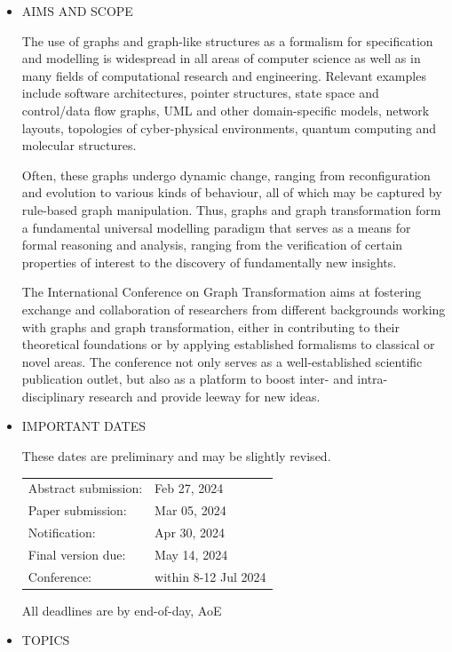 \documentclass[prodmode,acmtecs]{acmsmall} %
\begin{document}
\begin{itemize}\item  AIMS AND SCOPE 
 
  The use of graphs and graph-like structures as a formalism for specification and modelling is widespread in all areas of computer science as well as in many fields of computational research and engineering. Relevant examples include software architectures, pointer structures, state space and control/data flow graphs, UML and other domain-specific models, network layouts, topologies of cyber-physical environments, quantum computing and molecular structures.  
 
  Often, these graphs undergo dynamic change, ranging from reconfiguration and evolution to various kinds of behaviour, all of which may be captured by rule-based graph manipulation. Thus, graphs and graph transformation form a fundamental universal modelling paradigm that serves as a means for formal reasoning and analysis, ranging from the verification of certain properties of interest to the discovery of fundamentally new insights. 
 
  The International Conference on Graph Transformation aims at fostering exchange and collaboration of researchers from different backgrounds working with graphs and graph transformation, either in contributing to their theoretical foundations or by applying established formalisms to classical or novel areas. The conference not only serves as a well-established scientific publication outlet, but also as a platform to boost inter- and intra-disciplinary research and provide leeway for new ideas. 
 
\item  IMPORTANT DATES 
 
  These dates are preliminary and may be slightly revised. 
 
\begin{tabulary}{\linewidth}{LL}Abstract submission:  & Feb 27, 2024 \\
Paper submission:  & Mar 05, 2024 \\
Notification:  & Apr 30, 2024 \\
Final version due:  & May 14, 2024 \\
Conference:  & within 8-12 Jul 2024 \\
\end{tabulary}
 
  All deadlines are by end-of-day, AoE 
 
\item  TOPICS 
 

\end{itemize}
\end{document}
